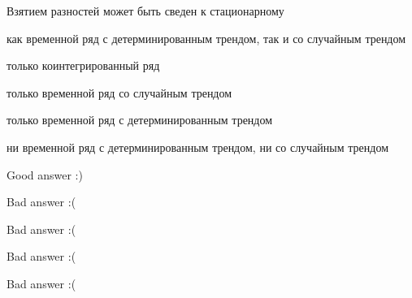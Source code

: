 
\begin{question}
Взятием разностей может быть сведен к стационарному
\begin{answerlist}
  \item как временной ряд с детерминированным трендом, так и со случайным трендом
  \item только коинтегрированный ряд
  \item только временной ряд со случайным трендом
  \item только временной ряд с детерминированным трендом
  \item ни временной ряд с детерминированным трендом, ни со случайным трендом
\end{answerlist}
\end{question}

\begin{solution}
\begin{answerlist}
  \item Good answer :)
  \item Bad answer :(
  \item Bad answer :(
  \item Bad answer :(
  \item Bad answer :(
\end{answerlist}
\end{solution}

